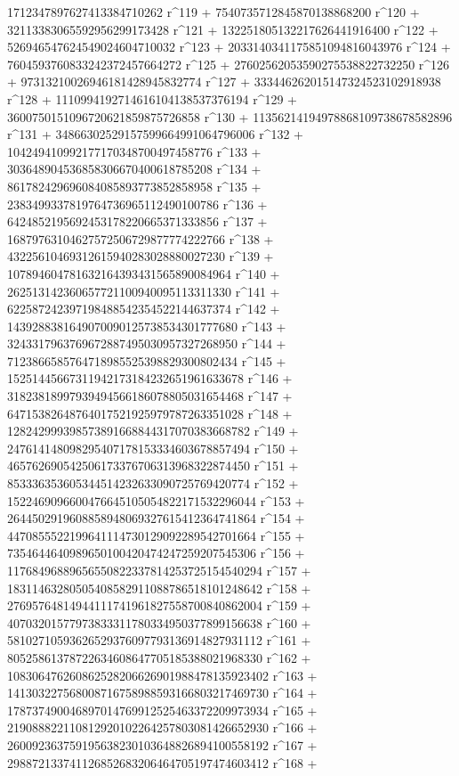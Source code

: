        1712347897627413384710262 r^119 + 
       7540735712845870138868200 r^120 + 
       32113383065592956299173428 r^121 + 
       132251805132217626441916400 r^122 + 
       526946547624549024604710032 r^123 + 
       2033140341175851094816043976 r^124 + 
       7604593760833242372457664272 r^125 + 
       27602562053590275538822732250 r^126 + 
       97313210026946181428945832774 r^127 + 
       333446262015147324523102918938 r^128 + 
       1110994192714616104138537376194 r^129 + 
       3600750151096720621859875726858 r^130 + 
       11356214194978868109738678582896 r^131 + 
       34866302529157599664991064796006 r^132 + 
       104249410992177170348700497458776 r^133 + 
       303648904536858306670400618785208 r^134 + 
       861782429696084085893773852858958 r^135 + 
       2383499337819764736965112490100786 r^136 + 
       6424852195692453178220665371333856 r^137 + 
       16879763104627572506729877774222766 r^138 + 
       43225610469312615940283028880027230 r^139 + 
       107894604781632164393431565890084964 r^140 + 
       262513142360657721100940095113311330 r^141 + 
       622587242397198488542354522144637374 r^142 + 
       1439288381649070090125738534301777680 r^143 + 
       3243317963769672887495030957327268950 r^144 + 
       7123866585764718985525398829300802434 r^145 + 
       15251445667311942173184232651961633678 r^146 + 
       31823818997939494566186078805031654468 r^147 + 
       64715382648764017521925979787263351028 r^148 + 
       128242999398573891668844317070383668782 r^149 + 
       247614148098295407178153334603678857494 r^150 + 
       465762690542506173376706313968322874450 r^151 + 
       853336353605344514232633090725769420774 r^152 + 
       1522469096600476645105054822171532296044 r^153 + 
       2644502919608858948069327615412364741864 r^154 + 
       4470855522199641114730129092289542701664 r^155 + 
       7354644640989650100420474247259207545306 r^156 + 
       11768496889656550822337814253725154540294 r^157 + 
       18311463280505408582911088786518101248642 r^158 + 
       27695764814944111741961827558700840862004 r^159 + 
       40703201577973833311780334950377899156638 r^160 + 
       58102710593626529376097793136914827931112 r^161 + 
       80525861378722634608647705185388021968330 r^162 + 
       108306476260862528206626901988478135923402 r^163 + 
       141303227568008716758988593166803217469730 r^164 + 
       178737490046897014769912525463372209973934 r^165 + 
       219088822110812920102264257803081426652930 r^166 + 
       260092363759195638230103648826894100558192 r^167 + 
       298872133741126852683206464705197474603412 r^168 + 
